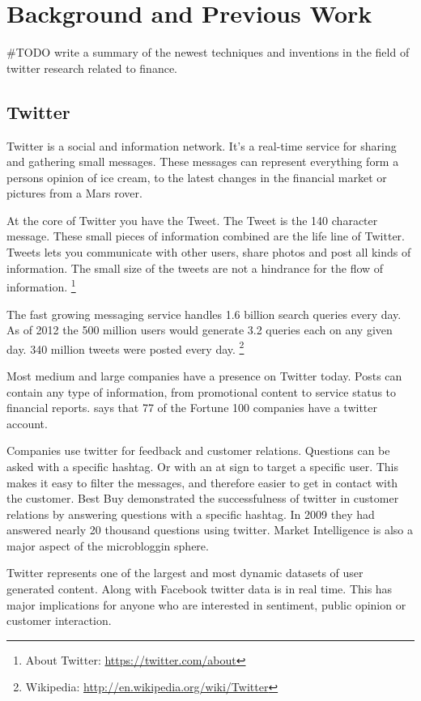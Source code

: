 \chapter{Background and Previous Work}\label{previous_work}
#TODO write a summary of the newest techniques and inventions in the field of twitter research related to finance. 

\section{Twitter}
Twitter is a social and information network. 
It's a real-time service for sharing and gathering small messages. These
messages can represent everything form a persons opinion of ice cream, to the
latest changes in the financial market or pictures from a Mars rover. 

At the core of Twitter you have the Tweet. The Tweet is the 140 character
message. These small pieces of information combined are the life line of Twitter.
Tweets lets you communicate with other users, share photos and post all kinds of
information. The small size of the tweets are not a hindrance for the flow of
information. 
\footnote{About Twitter: \url{https://twitter.com/about}}

The fast growing messaging service handles 1.6 billion search queries every day.
As of 2012 the 500 million users would generate 3.2 queries each on any given
day. 340 million tweets were posted every day. 
\footnote{Wikipedia: \url{http://en.wikipedia.org/wiki/Twitter}} 

Most medium and large companies have a presence on Twitter today. Posts can contain
any type of information, from promotional content to service status to
financial reports. \cite[p8]{annikajubbega11:twitter_driver_stock_price} says
that 77 of the Fortune 100 companies have a twitter account. 

Companies use twitter for feedback and customer relations. Questions can be
asked with a specific hashtag. Or with an at sign to target a specific user. This makes it easy to filter
the messages, and therefore easier to get in contact with the customer. Best
Buy demonstrated the successfulness of twitter in customer relations by
answering questions with a specific hashtag. In 2009 they had answered nearly
20 thousand questions using twitter. \cite[p1]{Li2013206}
Market Intelligence is also a major aspect of the microbloggin sphere.

Twitter represents one of the largest and most dynamic datasets of user
generated content. Along with Facebook twitter data is in real time. This has major
implications for anyone who are interested in sentiment, public opinion or
customer interaction. \cite[]{sperious11}

